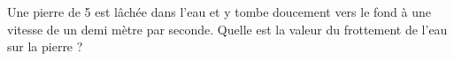 

\begin{exercice}\label{exo027}

Une pierre de \unit{5}{\kilo\gram} est lâchée dans l'eau et y tombe doucement vers le fond à une vitesse de un demi mètre par seconde. Quelle est la valeur du frottement de l'eau sur la pierre ?

\end{exercice}
